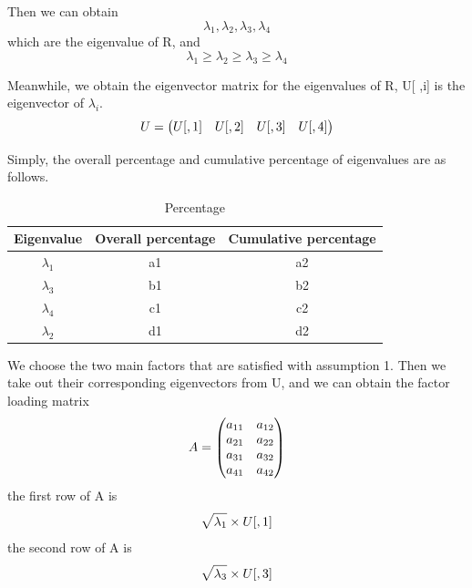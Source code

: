 \documentclass[a4paper,11pt]{article}
\begin{document}
\par Then we can obtain 
\[
\lambda_1, \lambda_2, \lambda_3, \lambda_4
\]
which are the eigenvalue of R, and
\[
    \lambda_1 \geqslant \lambda_2 \geqslant \lambda_3 \geqslant \lambda_4
\]
\par Meanwhile, we obtain the eigenvector matrix for the eigenvalues of R, U[ ,i] is the eigenvector of $\lambda_i$.
\begin{equation}
    \centering
U=\begin{pmatrix} U[ ,1] & U[ ,2] & U[ ,3] & U[ ,4]\end{pmatrix}
\end{equation}
\par Simply, the overall percentage and cumulative percentage of eigenvalues are as follows.
\begin{table}[!hbp]
    \centering 
    \begin{tabular}{|c|c|c|}
\hline
Eigenvalue & Overall percentage & Cumulative percentage \\
\hline
$\lambda_1$ & a1 & a2 \\
\hline
$\lambda_3$ & b1 & b2 \\
\hline
$\lambda_4$ & c1 & c2 \\
\hline
$\lambda_2$ & d1 & d2 \\
\hline
\end{tabular}
\caption{Percentage}
\end{table}
\par We choose the two main factors that are satisfied with assumption 1. Then we take out their corresponding eigenvectors from U, and we can obtain the factor loading matrix
\begin{equation}
    \centering
A=\begin{pmatrix} a_{11} & a_{12} \\ a_{21} & a_{22} \\ a_{31} & a_{32} \\ a_{41} & a_{42}\end{pmatrix}
\end{equation}
the first row of A is
\begin{equation}
    \centering
\sqrt{\lambda_1} \times U[ ,1]
\end{equation}
the second row of A is
\begin{equation}
    \centering
\sqrt{\lambda_3} \times U[ ,3]
\end{equation}

\end{document}
